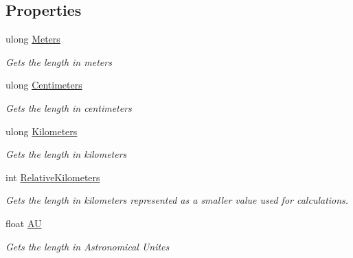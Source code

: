 \subsection*{Properties}
\begin{DoxyCompactItemize}
\item 
ulong \hyperlink{class_midnight_blue_1_1_length_ac824fa58d75ab754c33cdc8bfd49e5b0}{Meters}
\begin{DoxyCompactList}\small\item\em Gets the length in meters \end{DoxyCompactList}\item 
ulong \hyperlink{class_midnight_blue_1_1_length_a935aac3abfc2865e5960a40382227063}{Centimeters}
\begin{DoxyCompactList}\small\item\em Gets the length in centimeters \end{DoxyCompactList}\item 
ulong \hyperlink{class_midnight_blue_1_1_length_abf0d08eda94640cdb4706f96c3a97a29}{Kilometers}
\begin{DoxyCompactList}\small\item\em Gets the length in kilometers \end{DoxyCompactList}\item 
int \hyperlink{class_midnight_blue_1_1_length_a7073632b5e2dfc836266de44378941be}{Relative\+Kilometers}
\begin{DoxyCompactList}\small\item\em Gets the length in kilometers represented as a smaller value used for calculations. \end{DoxyCompactList}\item 
float \hyperlink{class_midnight_blue_1_1_length_aa2325bd4894b015715784b027551826f}{AU}
\begin{DoxyCompactList}\small\item\em Gets the length in Astronomical Unites \end{DoxyCompactList}\end{DoxyCompactItemize}



